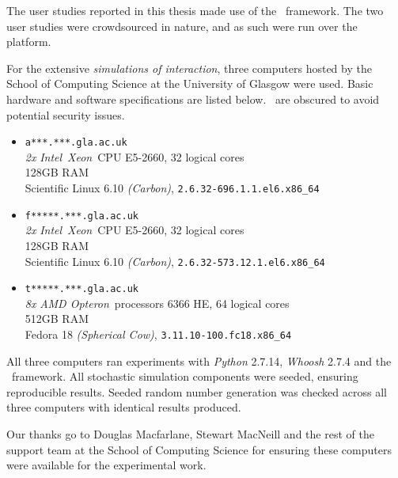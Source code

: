 
\begin{preamble}
{}


The user studies reported in this thesis made use of the \treconomics~framework. The two user studies were crowdsourced in nature, and as such were run over the~ platform.

For the extensive \emph{simulations of interaction}, three computers hosted by the School of Computing Science at the University of Glasgow were used. Basic hardware and software specifications are listed below.~ are obscured to avoid potential security issues.

\begin{itemize}
    
    \item{\texttt{a***.***.gla.ac.uk}\\\emph{2x} \emph{Intel}\textregistered~\emph{Xeon}\textregistered~CPU E5-2660, 32 logical cores\\128GB RAM\\Scientific Linux 6.10 \emph{(Carbon)}, \texttt{2.6.32-696.1.1.el6.x86\_64}}
    
    \item{\texttt{f*****.***.gla.ac.uk}\\\emph{2x} \emph{Intel}\textregistered~\emph{Xeon}\textregistered~CPU E5-2660, 32 logical cores\\128GB RAM\\Scientific Linux 6.10 \emph{(Carbon)}, \texttt{2.6.32-573.12.1.el6.x86\_64}}
    
    \item{\texttt{t*****.***.gla.ac.uk}\\\emph{8x} \emph{AMD Opteron}\texttrademark~processors 6366 HE, 64 logical cores\\512GB RAM\\Fedora 18 \emph{(Spherical Cow)}, \texttt{3.11.10-100.fc18.x86\_64}}
    
\end{itemize}

All three computers ran experiments with \emph{Python} 2.7.14, \emph{Whoosh} 2.7.4 and the \simiir~framework. All stochastic simulation components were seeded, ensuring reproducible results. Seeded random number generation was checked across all three computers with identical results produced.

Our thanks go to Douglas Macfarlane, Stewart MacNeill and the rest of the support team at the School of Computing Science for ensuring these computers were available for the experimental work.
\end{preamble}

\newpage
\thispagestyle{empty}
\mbox{}
\newpage
\thispagestyle{empty}
\mbox{}
\newpage
